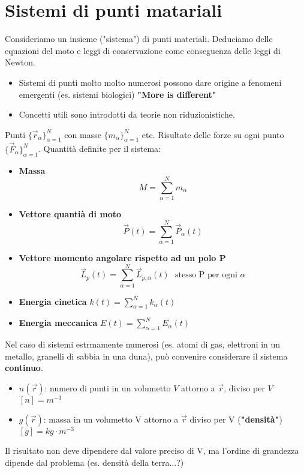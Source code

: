 \newpage
\section{Sistemi di punti matariali}
Consideriamo un insieme ("sistema") di punti materiali. Deduciamo delle equazioni del moto e leggi di conservazione 
come conseguenza delle leggi di Newton.
\begin{itemize}
    \item Sistemi di punti molto molto numerosi possono dare origine a fenomeni emergenti (es. sistemi biologici) \textbf{"More is different"}
    \item Concetti utili sono introdotti da teorie non riduzionistiche.
\end{itemize}
Punti $\{\vec{r}_{\alpha}\}^N_{\alpha=1}$ con masse $\{m_{\alpha}\}^N_{\alpha = 1}$ etc. Risultate delle forze su ogni punto $\{\vec{F}_{\alpha}\}^N_{\alpha = 1}$.
Quantità definite per il sistema:
\begin{itemize}
    \item \textbf{Massa} $$M = \sum_{\alpha = 1}^{N}m_{\alpha}$$
    \item \textbf{Vettore quantià di moto} $$\vec{P}(t) = \sum_{\alpha = 1}^{N} \vec{P}_{\alpha}(t)$$
    \item \textbf{Vettore momento angolare rispetto ad un polo P} $$\vec{L}_p(t) = \sum_{\alpha = 1}^{N}\vec{L}_{p, \alpha}(t) \:\:\: \text{stesso P per ogni }\alpha$$
    \item \textbf{Energia cinetica} $k(t) = \sum_{\alpha=1}^{N}k_{\alpha}(t)$
    \item \textbf{Energia meccanica} $E(t) = \sum_{\alpha=1}^{N}E_{\alpha}(t)$
\end{itemize}
Nel caso di sistemi estrmamente numerosi (es. atomi di gas, elettroni in un metallo, granelli di sabbia in una duna), può convenire
considerare il sistema \textbf{continuo}.
\begin{itemize}
    \item $n(\vec{r})$: numero di punti in un volumetto $V$ attorno a $\vec{r}$, diviso per $V$ $[n] = m^{-3}$
    \item $g(\vec{r})$: massa in un volumetto V attorno a $\vec{r}$ diviso per V (\textbf{"densità"}) $[g] = kg \cdot m^{-3}$
\end{itemize}
\begin{observation}
    Il risultato non deve dipendere dal valore preciso di V, ma l'ordine di grandezza dipende dal problema (es. densità della terra...?)
\end{observation}
